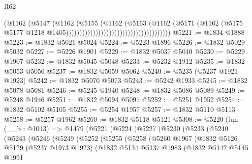 \begin{lexlean}{R62}
\begin{coremodule}
                                                              (@1162
                                                                (@5147
                                                                  (@1162
                                                                    (@5155
                                                                      (@1162
                                                                        (@5163
                                                                          (@1162
                                                                            (@5171
                                                                              (@1162
                                                                                (@5175
                                                                                  @5177
                                                                                  @1218
                                                                                  @1405)))))))))))))))))))))))))))))))))))))))
@5221 := @1834 @1888
@5223 := @1832 @5021 @5024
@5224 := @5223 @1896
@5226 := @1832 @5029 @5032
@5227 := @5226 @1901
@5229 := @1832 @5037 @5040
@5230 := @5229 @1907
@5232 := @1832 @5045 @5048
@5233 := @5232 @1912
@5235 := @1832 @5053 @5056
@5237 := @1832 @5059 @5062
@5240 := @5235 (@5237 @1921 @1923)
@5242 := @1832 @5070 @5073
@5243 := @5242 @1933
@5245 := @1832 @5078 @5081
@5246 := @5245 @1940
@5248 := @1832 @5086 @5089
@5249 := @5248 @1946
@5251 := @1832 @5094 @5097
@5252 := @5251 @1952
@5254 := @1832 @5102 @5105
@5255 := @5254 @1957
@5257 := @1832 @5110 @5113
@5258 := @5257 @1962
@5260 := @1832 @5118 @5121
@5308 := @5220
    (fun (__b : @1013) =>
    @1479
      (@5221
        (@5224
          (@5227
            (@5230
              (@5233
                (@5240
                  (@5243
                    (@5246
                      (@5249
                        (@5252
                          (@5255
                            (@5258
                              (@5260
                                @1967
                                (@1832
                                  @5126
                                  @5129
                                  (@5237 @1973 @1923)
                                  (@1832
                                    @5134
                                    @5137
                                    @1983
                                    (@1832
                                      @5142
                                      @5145
                                      @1991

\end{coremodule}
\end{lexlean}
